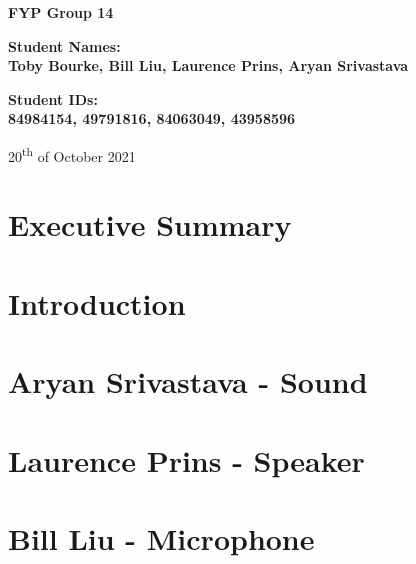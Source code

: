 \documentclass[a4paper,12pt]{article}
\begin{document}
\begin{titlepage}
    \begin{center}
        \vspace*{1cm}
 
        {\huge\textbf{FYP Group 14\\}}
         
         \vspace{12cm}
         \textbf{Student Names:\\Toby Bourke, Bill Liu, Laurence Prins, Aryan Srivastava}\\
         \vspace{1cm}
         
         \textbf{Student IDs:\\84984154, 49791816, 84063049, 43958596}\\
         
        \vspace{3.5cm}
        
        20\textsuperscript{th} of October 2021
             
    \end{center}
 \end{titlepage}

\section*{Executive Summary}


\pagebreak
\tableofcontents

\pagebreak
\section{Introduction}


\pagebreak
\section{Aryan Srivastava - Sound}


\pagebreak
\section{Laurence Prins - Speaker}


\pagebreak
\section{Bill Liu - Microphone}

\end{document}
